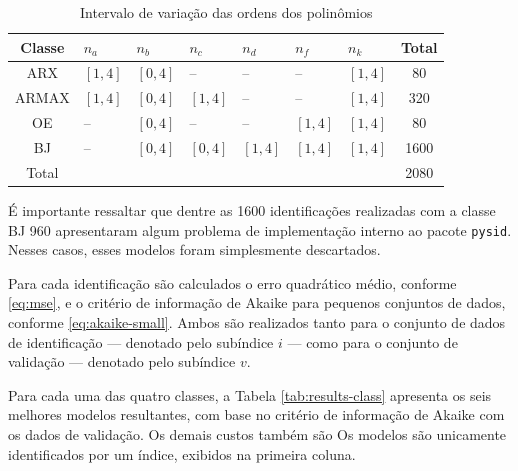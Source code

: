 \documentclass{ppgeesa}
\begin{document}
\begin{table}[!htbp]
  \centering
  \caption{Intervalo de variação das ordens dos polinômios}
  \label{tab:orders}
  \setlength{\extrarowheight}{1pt}
  \begin{tabularx}{\linewidth}{@{} c *{6}{C} c @{}}
    \toprule
    Classe & $n_a$    & $n_b$    & $n_c$    & $n_d$    & $n_f$    & $n_k$    & Total \\
    \midrule
    ARX    & $[1, 4]$ & $[0, 4]$ & --       & --       & --       & $[1, 4]$ & 80    \\
    ARMAX  & $[1, 4]$ & $[0, 4]$ & $[1, 4]$ & --       & --       & $[1, 4]$ & 320   \\
    OE     & --       & $[0, 4]$ & --       & --       & $[1, 4]$ & $[1, 4]$ & 80    \\
    BJ     & --       & $[0, 4]$ & $[0, 4]$ & $[1, 4]$ & $[1, 4]$ & $[1, 4]$ & 1600  \\
    \midrule
    Total  &          &          &          &          &          &          & 2080  \\
    \bottomrule
  \end{tabularx}
\end{table}

É importante ressaltar que dentre as 1600 identificações realizadas com a classe BJ 960 apresentaram algum problema de implementação interno ao pacote \texttt{pysid}.
Nesses casos, esses modelos foram simplesmente descartados.

Para cada identificação são calculados o erro quadrático médio, conforme \eqref{eq:mse}, e o critério de informação de Akaike para pequenos conjuntos de dados, conforme \eqref{eq:akaike-small}.
Ambos são realizados tanto para o conjunto de dados de identificação --- denotado pelo subíndice $i$ --- como para o conjunto de validação --- denotado pelo subíndice $v$.

Para cada uma das quatro classes, a Tabela \ref{tab:results-class} apresenta os seis melhores modelos resultantes, com base no critério de informação de Akaike com os dados de validação.
Os demais custos também são
Os modelos são unicamente identificados por um índice, exibidos na primeira coluna.
\end{document}
